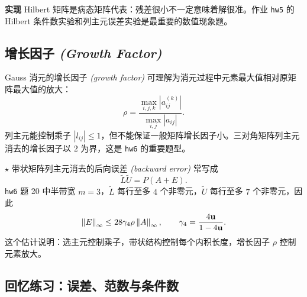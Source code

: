 \documentclass{article}
\newcommand{\keypoint}{\textcolor{red!65!black}{\textbf{$\star$}}}
\newcommand{\impl}{\textcolor{blue!65!black}{\textbf{实现}}}
\newcommand{\eng}[1]{\texorpdfstring{{\normalfont\rmfamily\itshape\textcolor{blue!65!black}{(#1)}}}{(#1)}}
\begin{document}
\impl{} Hilbert 矩阵是病态矩阵代表：残差很小不一定意味着解很准。作业 \texttt{hw5}
的 Hilbert 条件数实验和列主元误差实验是最重要的数值现象题。

\subsection{增长因子 \eng{Growth Factor}}

Gauss 消元的增长因子 \eng{growth factor} 可理解为消元过程中元素最大值相对原矩阵最大值的放大：
\[
  \rho=\frac{\max_{i,j,k}|a_{ij}^{(k)}|}{\max_{i,j}|a_{ij}|}.
\]
列主元能控制乘子 $|l_{ij}|\le1$，但不能保证一般矩阵增长因子小。三对角矩阵列主元消去的增长因子以 $2$ 为界，这是 \texttt{hw6} 的重要题型。

\keypoint{} 带状矩阵列主元消去的后向误差 \eng{backward error} 常写成
\[
  \tilde L\tilde U=P(A+E).
\]
\texttt{hw6} 题 20 中半带宽 $m=3$，$\tilde L$ 每行至多 $4$ 个非零元，$\tilde U$ 每行至多
$7$ 个非零元，因此
\[
  \left\| E \right\|_\infty\le 28\gamma_4\rho\left\| A \right\|_\infty,\qquad
  \gamma_4=\frac{4\mathbf u}{1-4\mathbf u}.
\]
这个估计说明：选主元控制乘子，带状结构控制每个内积长度，增长因子 $\rho$ 控制元素放大。

\subsection{回忆练习：误差、范数与条件数}
\end{document}
